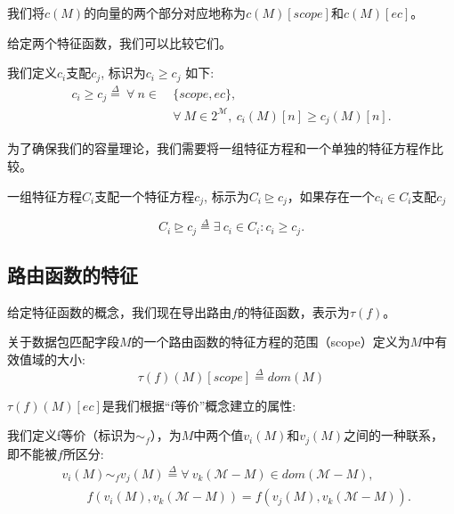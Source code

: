 我们将$c(M)$的向量的两个部分对应地称为$c(M)[scope]$和$c(M)[ec]$。

给定两个特征函数，我们可以比较它们。 

\begin{definition}我们定义$c_i$支配$c_j$, 标识为$c_i \geq c_j$ 如下:
\begin{equation*}
\begin{split}
c_i \geq c_j \overset{\Delta}{=}\ \forall\ n \in\ &\{scope, ec\},\\
&\forall\ M \in 2^\mathcal{M},\ c_i(M)[n] \geq c_j(M)[n].
\end{split}
\end{equation*}
\end{definition}

为了确保我们的容量理论，我们需要将一组特征方程和一个单独的特征方程作比较。


\begin{definition}
一组特征方程$C_i$支配一个特征方程$c_j$, 标示为$C_i \trianglerighteq c_j$，如果存在一个$c_i \in C_i$支配$c_j$

\begin{equation*}
C_i \trianglerighteq c_j \overset{\Delta}{=} \exists\ c_i \in C_i : c_i \geq c_j.
\end{equation*}
\end{definition}
 
\subsection{路由函数的特征} 
给定特征函数的概念，我们现在导出路由$f$的特征函数，表示为$\tau(f)$。

\begin{definition}
\label{def:set-comparator}
关于数据包匹配字段$M$的一个路由函数的特征方程的范围（scope）定义为$M$中有效值域的大小:
\begin{equation*}
\tau(f)(M)[scope] \overset{\Delta}{=} dom(M)
\end{equation*}
\end{definition}

$\tau(f)(M)[ec]$是我们根据``f等价''概念建立的属性: 
\begin{definition} 我们定义f等价（标识为$\sim_f$），为$M$中两个值$v_i(M)$和$v_j(M)$之间的一种联系，即不能被$f$所区分:
\begin{equation*}
\begin{split}
&v_i(M) \sim_f v_j(M) \overset{\Delta}{=} \forall\ v_k(\mathcal{M} - M) \in dom(\mathcal{M} - M),\\
&\qquad f(v_i(M), v_k(\mathcal{M} - M)) = f(v_j(M), v_k(\mathcal{M} - M)). 
\end{split}
\end{equation*}
\end{definition}



